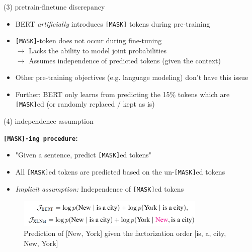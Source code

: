 
\begin{frame}{(3) pretrain-finetune discrepancy}

\vfill

	\begin{itemize}
		\item BERT \textit{artificially} introduces \texttt{[MASK]} tokens during pre-training
		\item \texttt{[MASK]}-token does not occur during fine-tuning\\
					$\rightarrow$ Lacks the ability to model joint probabilities\\
					$\rightarrow$ Assumes independence of predicted tokens (given the context)
		\item Other pre-training objectives (e.g. language modeling) don't have this issue
		\item Further: BERT only learns from predicting the 15\% tokens which are \texttt{[MASK]}ed (or randomly replaced / kept as is)
	\end{itemize}

\vfill

\end{frame}


\begin{frame}{(4) independence assumption}

\vspace{1.5cm}

\textbf{\texttt{[MASK]-ing procedure}:}

\begin{itemize}
	\item "Given a sentence, predict \texttt{[MASK]}ed tokens"
	\item All \texttt{[MASK]}ed tokens are predicted based on the un-\texttt{[MASK]}ed tokens
	\item \textit{Implicit assumption:} Independence of \texttt{[MASK]}ed tokens
\end{itemize}

	\begin{figure}
		\centering
		\includegraphics[width = 9cm]{figure/xlnet-objective}\\ 
		{\tiny Prediction of [New, York] given the factorization order [is, a, city, New, York]}\\
	\end{figure}
	
\end{frame}


